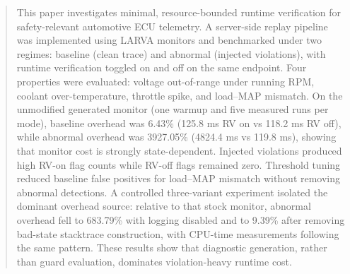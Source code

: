 \begin{abstract}
This paper investigates minimal, resource-bounded runtime verification for safety-relevant automotive ECU telemetry. A server-side replay pipeline was implemented using LARVA monitors and benchmarked under two regimes: baseline (clean trace) and abnormal (injected violations), with runtime verification toggled on and off on the same endpoint. Four properties were evaluated: voltage out-of-range under running RPM, coolant over-temperature, throttle spike, and load--MAP mismatch. On the unmodified generated monitor (one warmup and five measured runs per mode), baseline overhead was 6.43\% (125.8 ms RV on vs 118.2 ms RV off), while abnormal overhead was 3927.05\% (4824.4 ms vs 119.8 ms), showing that monitor cost is strongly state-dependent. Injected violations produced high RV-on flag counts while RV-off flags remained zero. Threshold tuning reduced baseline false positives for load--MAP mismatch without removing abnormal detections. A controlled three-variant experiment isolated the dominant overhead source: relative to that stock monitor, abnormal overhead fell to 683.79\% with logging disabled and to 9.39\% after removing bad-state stacktrace construction, with CPU-time measurements following the same pattern. These results show that diagnostic generation, rather than guard evaluation, dominates violation-heavy runtime cost.
\end{abstract}